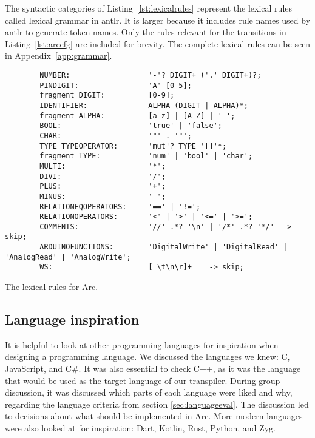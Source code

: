 The syntactic categories of Listing~\ref{lst:lexicalrules} represent the lexical rules called lexical grammar in \gls{antlr}. It is larger because it includes rule names used by \gls{antlr} to generate token names. Only the rules relevant for the transitions in Listing~\ref{lst:arccfg} are included for brevity. The complete lexical rules can be seen in Appendix~\ref{app:grammar}.


\begin{listing}[htb!]
    \begin{verbatim}
        NUMBER:                  '-'? DIGIT+ ('.' DIGIT+)?;
        PINDIGIT:                'A' [0-5];
        fragment DIGIT:          [0-9];
        IDENTIFIER:              ALPHA (DIGIT | ALPHA)*;
        fragment ALPHA:          [a-z] | [A-Z] | '_';
        BOOL:                    'true' | 'false';
        CHAR:                    '"' . '"';
        TYPE_TYPEOPERATOR:       'mut'? TYPE '[]'*;
        fragment TYPE:           'num' | 'bool' | 'char';
        MULTI:                   '*';
        DIVI:                    '/';
        PLUS:                    '+';
        MINUS:                   '-';
        RELATIONEQOPERATORS:     '==' | '!=';
        RELATIONOPERATORS:       '<' | '>' | '<=' | '>=';
        COMMENTS:                '//' .*? '\n' | '/*' .*? '*/'  -> skip;
        ARDUINOFUNCTIONS:        'DigitalWrite' | 'DigitalRead' | 'AnalogRead' | 'AnalogWrite';
        WS:                      [ \t\n\r]+    -> skip;
    \end{verbatim}
    \caption{The lexical rules for Arc.}
    \label{lst:lexicalrules}
\end{listing}


\subsection{Language inspiration}\label{sec:inspiration}
It is helpful to look at other programming languages for inspiration when designing a programming language. We discussed the languages we knew: C, JavaScript, and C\#. It was also essential to check C++, as it was the language that would be used as the target language of our transpiler. During group discussion, it was discussed which parts of each language were liked and why, regarding the language criteria from section \ref{sec:languageeval}. The discussion led to decisions about what should be implemented in Arc. More modern languages were also looked at for inspiration: Dart, Kotlin, Rust, Python, and Zyg.

